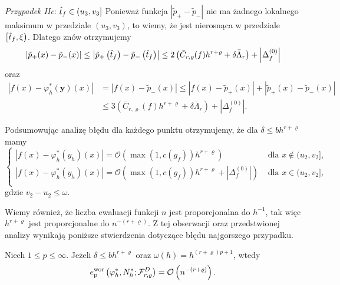 \documentclass[oik, pdftex, robocza, man]{mgrwms}
\begin{document}
    \textit{Przypadek IIc}: $\hat{t}_{f} \in\left(u_{3}, v_{3}\right]$
    Ponieważ funkcja $\left|\tilde{p}_{+}-\tilde{p}_{-}\right|$ nie ma żadnego lokalnego maksimum w przedziale $\left(u_{3}, v_{3}\right)$, to wiemy, że jest nierosnąca w przedziale $\left[\hat{t}_{f}, \xi\right)$. Dlatego znów otrzymujemy
    \begin{equation*}
        \left|\tilde{p}_{+}(x)-\tilde{p}_{-}(x)\right| \leq\left|\tilde{p}_{+}\left(\hat{t}_{f}\right)-\tilde{p}_{-}\left(\hat{t}_{f}\right)\right| \leq 2\left(\bar{C}_{r, \varrho}(f) h^{r+\varrho}+\delta \bar{\Lambda}_{r}\right)+\left|\Delta_{f}^{(0)}\right|
    \end{equation*}
    oraz
    \begin{equation*}
        \begin{aligned}
            \left|f(x)-\varphi_{h}^{*}(\mathbf{y})(x)\right| &=\left|f(x)-\tilde{p}_{-}(x)\right| \leq\left|f(x)-\tilde{p}_{+}(x)\right|+\left|\tilde{p}_{+}(x)-\tilde{p}_{-}(x)\right| \\
            & \leq 3\left(\bar{C}_{r, \varrho}(f) h^{r+\varrho}+\delta \bar{\Lambda}_{r}\right)+\left|\Delta_{f}^{(0)}\right|.
        \end{aligned}
    \end{equation*}

    Podsumowując analizę błędu dla każdego punktu otrzymujemy, że dla $\delta \leq bh^{r+\varrho}$ mamy
    \begin{equation*}
        \begin{cases}
            |f(x) - \varphi_{h}^{*}(y_{h})(x)| = \mathcal{O} (\max(1, c(g_{f})) h^{r+\varrho}) & \text{ dla } x \notin (u_{2}, v_{2}], \\
            |f(x) - \varphi_{h}^{*}(y_{h})(x)| = \mathcal{O} (\max(1, c(g_{f})) h^{r+\varrho} + |\Delta_{f}^{(0)}|) & \text{ dla } x \in (u_{2}, v_{2}], \\
        \end{cases}
    \end{equation*}
    gdzie $v_{2} - u_{2} \leq \omega$.

    Wiemy również, że liczba ewaluacji funkcji $n$ jest proporcjonalna do $h^{-1}$, tak więc $h^{r+\varrho}$ jest proporcjonalne do $n^{-(r+\varrho)}$. Z tej obserwacji oraz przedstwionej analizy wynikają poniższe stwierdzenia dotyczące błędu najgorszego przypadku.

    \begin{stw}
        \label{stw2}
        Niech $1 \leq p \leq \infty$. Jeżeli $\delta \leq bh^{r+\varrho}$ oraz $\omega(h) = h^{(r+\varrho)p + 1}$, wtedy
        \begin{equation*}
            e_{\mathrm{p}}^{\mathrm{wor}}\left(\varphi_{h}^{*}, N_{h}^{*} ; \mathcal{F}_{r, \varrho}^{D}\right)=\mathcal{O}\left(n^{-(r+\varrho)}\right).
        \end{equation*}
    \end{stw}
\end{document}
